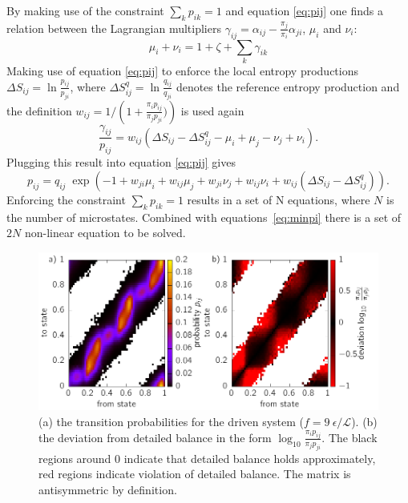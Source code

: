  By making use of the constraint $\sum_k p_{ik}=1$ and equation \ref{eq:pij} one finds a relation between the Lagrangian multipliers $\gamma_{ij} = \alpha_{ij} - \frac{\pi_j}{\pi_i} \alpha_{ji}$, $\mu_i$ and $\nu_i$:
  \begin{equation}
    \mu_i + \nu_i = 1 + \zeta + \sum_k  \gamma_{ik}
  \label{eq:minpi}
  \end{equation}
  Making use of equation \ref{eq:pij} to enforce the local entropy productions $\Delta S_{ij} = \ln \frac{p_{ij}}{p_{ji}}$, where $\Delta S_{ij}^q = \ln \frac{ q_{ij}}{q_{ji}}$ denotes the reference entropy production and the definition $w_{ij} = 1/\left(1 + \frac{\pi_i p_{ij}}{\pi_j p_{ji}} ) \right)$ is used again
    \begin{equation}
    \frac{ \gamma_{ij}}{p_{ij}} = w_{ij} \left ( \Delta S_{ij} - \Delta 
S_{ij}^q -\mu_i +\mu_j -\nu_j +\nu_i \right ).
      \label{eq:alpha}
    \end{equation}
Plugging this result into equation \ref{eq:pij} gives
\begin{equation}
  p_{ij} = q_{ij} \; \exp \left ( -1 + w_{ji} \mu_i + w_{ij} \mu_j 
  + w_{ji} \nu_j + w_{ij} \nu_i + w_{ij} ( \Delta S_{ij} - \Delta S_{ij}^q )  \right ) . 
\label{eq:pij2}
\end{equation}
Enforcing the constraint $\sum_k p_{ik} =1 $ results in a set of 
N equations, where $N$ is the number of microstates. Combined with equations~\ref{eq:minpi} there is a set of $2N$ non-linear equation to be solved.
 \begin{figure}[t]
 \centering
 \includegraphics{../plots/Jaynes/ratio_all.pdf}
 \caption[Transition probability matrix of the 1D driven system and the violation of detailed balance.]{(a) the transition probabilities for the driven system ($f=9~\epsilon / \mathcal{L}$). (b) the deviation from detailed balance in the form $\log_{10} \frac{\pi_i p_{ij}}{\pi_j p_{ji}}$. The black regions around $0$ indicate that detailed balance holds approximately, red regions indicate violation of detailed balance. The matrix is antisymmetric by definition.}
 \label{fig:Sprod}
\end{figure}
